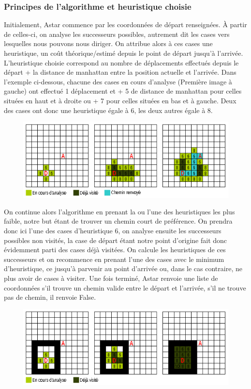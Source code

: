 \documentclass{article}
\begin{document}
  \subsubsection{Principes de l'algorithme et heuristique choisie}

	Initialement, Astar commence par les coordonnées de départ renseignées. À partir de celles-ci, on analyse les successeurs possibles, autrement dit les cases vers lesquelles nous pouvons nous diriger. On attribue alors à ces cases une heuristique, un coût théorique/estimé depuis le point de départ jusqu'à l'arrivée. L'heuristique choisie correspond au nombre de déplacements effectués depuis le départ + la distance de manhattan entre la position actuelle et l'arrivée. Dans l'exemple ci-dessous, chacune des cases en cours d'analyse (Première image à gauche) ont effectué 1 déplacement et + 5 de distance de manhattan pour celles situées en haut et à droite ou + 7 pour celles situées en bas et à gauche. Deux des cases ont donc une heuristique égale à 6, les deux autres égale à 8.
	
  \begin{figure}[h]
	\center
	\includegraphics[scale=1.2]{../images/Astar01.png}
  \end{figure}

	On continue alors l'algorithme en prenant la ou l'une des heuristiques les plus faible, notre but étant de trouver un chemin court de préférence. On prendra donc ici l'une des cases d'heuristique 6, on analyse ensuite les successeurs possibles non visités, la case de départ étant notre point d'origine fait donc évidemment parti des cases déjà visitées. On calcule les heuristiques de ces successeurs et on recommence en prenant l'une des cases avec le minimum d'heuristique, ce jusqu'à parvenir au point d'arrivée ou, dans le cas contraire, ne plus avoir de cases à visiter. Une fois terminé, Astar renvoie une liste de coordonnées s'il trouve un chemin valide entre le départ et l'arrivée, s'il ne trouve pas de chemin, il renvoie False.

  \begin{figure}[h]
	\center
	\includegraphics[scale=1.2]{../images/Astar02.png}
  \end{figure}
	
\end{document}
